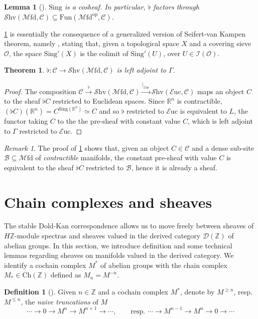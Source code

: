 \documentclass[10pt]{amsart}
\newcommand{\B}{\mathscr{B}}
\newcommand{\C}{\mathscr{C}}
\newcommand{\D}{\mathscr{D}}
\newcommand{\I}{\mathscr{I}}
\newcommand{\bR}{\mathbb{R}}
\newcommand{\bZ}{\mathbb{Z}}
\newcommand{\Ch}{\mathrm{Ch}}
\newcommand{\Fun}{\mathrm{Fun}}
\newcommand{\Euc}{\mathscr{E}\mathrm{uc}}
\newcommand{\Mfd}{\mathscr{M}\mathrm{fd}}
\newcommand{\Shv}{\mathscr{S}\mathrm{hv}}
\newcommand{\Sing}{\mathrm{Sing}}
\newcommand{\op}{\mathrm{op}}
\newtheorem{theorem}[equation]{Theorem}
\newtheorem{lemma}[equation]{Lemma}
\theoremstyle{definition}
\newtheorem{definition}[equation]{Definition}
\theoremstyle{remark}
\newtheorem{remark}[equation]{Remark}
\numberwithin{equation}{section}
\begin{document}
\begin{lemma}[{\cite[Corollary 6.46]{bunkegepner2021differential}}]\label{lem:flatsheaf}
  $\Sing$ is a cosheaf. In particular,
  $\flat$ factors through $\Shv(\Mfd,\C)\subseteq\Fun(\Mfd^{\op},\C)$.
\end{lemma}
\cref{lem:flatsheaf} is essentially the consequence of a generalized version of Seifert-van Kampen theorem, namely \cite[Proposition A.3.2]{lurie2017ha}, stating that, given a topological space $X$ and a covering sieve $\mathscr{O}$, the space $\Sing'(X)$ is the colimit of $\Sing'(U)$, over $U\in\I(\mathscr{O})$.
\begin{theorem}\label{thm:leftadjoint}
  $\flat:\C\to\Shv(\Mfd,\C)$ is left adjoint to $\Gamma$.
\end{theorem}
\begin{proof}
  The composition $\C\xrightarrow{\flat}\Shv(\Mfd,\C)\xrightarrow{|_{\Euc}}\Shv(\Euc,\C)$ maps an object $C$ to the sheaf $\flat C$ restricted to Euclidean spaces. Since $\bR^n$ is contractible, $(\flat C)(\bR^n)=C^{\Sing(\bR^n)}\simeq C$ and so $\flat$ restricted to $\Euc$ is equivalent to $L$, the functor taking $C$ to the the pre-sheaf with constant value $C$, which is left adjoint to $\Gamma$ restricted to $\Euc$.
\end{proof}
\begin{remark}\label{rmk:constsheaf}
  The proof of \cref{thm:leftadjoint} shows that, given an object $C\in\C$ and a dense sub-site $\B\subseteq\Mfd$ of \emph{contractible} manifolds, the constant pre-sheaf with value $C$ is equivalent to the sheaf $\flat C$ restricted to $\B$, hence it is already a sheaf. 
\end{remark}

\section{Chain complexes and sheaves}

The stable Dold-Kan correspondence allows us to move freely between sheaves of $H\bZ$-module spectras and sheaves valued in the derived category $\D(\bZ)$ of abelian groups. In this section, we introduce definition and some technical lemmas regarding sheaves on manifolds valued in the derived category. We identify a cochain complex $M^*$ of abelian groups with the chain complex $M_*\in\Ch(\bZ)$ defined as $M_n=M^{-n}$.
\begin{definition}[{\cite[Definition 7.14]{bunkenikolausvoelkl2016diffcoh}}]Given $n\in\bZ$ and a cochain complex $M^*$, denote by $M^{\geq n}$, resp. $M^{\leq n}$, the \emph{naive truncations} of $M$ \[\cdots\to0\to M^n\to M^{n+1}\to\cdots, \qquad \mbox{resp. }\cdots\to M^{n-1}\to M^n\to0\to\cdots\]
\end{definition}
\end{document}
